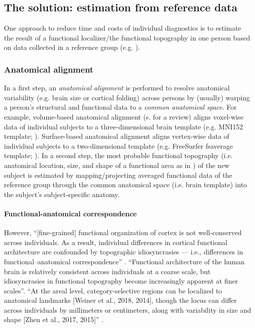 \subsection{The solution: estimation from reference data}


One approach to reduce time and costs of individual diagnostics is to estimate
the result of a functional localizer/the functional topography in one person
based on data collected in a reference group (e.g. \citet{weiner2018defining}).


\subsubsection{Anatomical alignment}
In a first step, an \textit{anatomical alignment} is performed to resolve
anatomical variability (e.g. brain size or cortical folding) across persons by
(usually) warping a person's structural and functional data to a \textit{common
anatomical space}.
For example, volume-based anatomical alignment (s. \citep{klein2009evaluation}
for a review) aligns voxel-wise data of individual subjects to a
three-dimensional brain template (e.g. MNI152 template;
\citep{fonov2011unbiased}).
Surface-based anatomical alignment \citep{fischl1999cortical} aligns vertex-wise
data of individual subjects to a two-dimensional template (e.g. FreeSurfer
fsaverage template; \citep{fischl1999high}).
In a second step, the most probable functional topography (i.e. anatomical
location, size, and shape of a functional area as in \citep{weiner2018defining})
of the new subject is estimated by mapping/projecting averaged functional data
of the reference group through the common anatomical space (i.e. brain template)
into the subject's subject-specific anatomy.


\paragraph{Functional-anatomical correspondence}


However, ``[fine-grained] functional organization of cortex is not
well-conserved across individuals. As a result, individual differences in
cortical functional architecture are confounded by topographic idiosyncrasies
--- i.e., differences in functional--anatomical correspondence''
\citep{feilong2018reliable}.
%
``Functional architecture of the human brain is relatively consistent across
individuals at a coarse scale, but idiosyncrasies in functional topography
become increasingly apparent at finer scales''\citep{feilong2018reliable}.
``At the areal level, category-selective regions can be localized to anatomical
landmarks [Weiner et al., 2018, 2014], though the locus can differ across
individuals by millimeters or centimeters, along with variability in size and
shape [Zhen et al., 2017, 2015]'' \citep{feilong2018reliable}.

